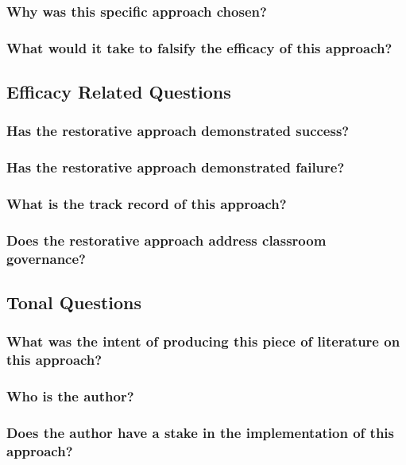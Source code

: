 \documentclass[12pt]{article}
\begin{document}
	\subsubsection{Why was this specific approach chosen?}
	\subsubsection{What would it take to falsify the efficacy of this approach?}
	\subsection{Efficacy Related Questions}
	\subsubsection{Has the restorative approach demonstrated success?}
	\subsubsection{Has the restorative approach demonstrated failure?}
	\subsubsection{What is the track record of this approach?}
	\subsubsection{Does the restorative approach address classroom governance?}
	\subsection{Tonal Questions}
	\subsubsection{What was the intent of producing this piece of literature on this approach?}
	\subsubsection{Who is the author?}
	\subsubsection{Does the author have a stake in the implementation of this approach?}
\end{document}
